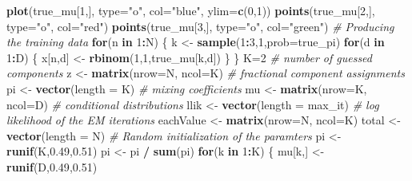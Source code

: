 \documentclass[]{article}
\newenvironment{Shaded}{\begin{snugshade}}{\end{snugshade}}
\newcommand{\KeywordTok}[1]{\textcolor[rgb]{0.13,0.29,0.53}{\textbf{#1}}}
\newcommand{\DataTypeTok}[1]{\textcolor[rgb]{0.13,0.29,0.53}{#1}}
\newcommand{\DecValTok}[1]{\textcolor[rgb]{0.00,0.00,0.81}{#1}}
\newcommand{\FloatTok}[1]{\textcolor[rgb]{0.00,0.00,0.81}{#1}}
\newcommand{\StringTok}[1]{\textcolor[rgb]{0.31,0.60,0.02}{#1}}
\newcommand{\CommentTok}[1]{\textcolor[rgb]{0.56,0.35,0.01}{\textit{#1}}}
\newcommand{\ControlFlowTok}[1]{\textcolor[rgb]{0.13,0.29,0.53}{\textbf{#1}}}
\newcommand{\OperatorTok}[1]{\textcolor[rgb]{0.81,0.36,0.00}{\textbf{#1}}}
\newcommand{\NormalTok}[1]{#1}
\begin{document}
\begin{Shaded}
\begin{Highlighting}[]
{\KeywordTok{plot}\NormalTok{(true_mu[}\DecValTok{1}\NormalTok{,], }\DataTypeTok{type=}\StringTok{"o"}\NormalTok{, }\DataTypeTok{col=}\StringTok{"blue"}\NormalTok{, }\DataTypeTok{ylim=}\KeywordTok{c}\NormalTok{(}\DecValTok{0}\NormalTok{,}\DecValTok{1}\NormalTok{))}
\KeywordTok{points}\NormalTok{(true_mu[}\DecValTok{2}\NormalTok{,], }\DataTypeTok{type=}\StringTok{"o"}\NormalTok{, }\DataTypeTok{col=}\StringTok{"red"}\NormalTok{)}
\KeywordTok{points}\NormalTok{(true_mu[}\DecValTok{3}\NormalTok{,], }\DataTypeTok{type=}\StringTok{"o"}\NormalTok{, }\DataTypeTok{col=}\StringTok{"green"}\NormalTok{)}
\CommentTok{# Producing the training data}
\ControlFlowTok{for}\NormalTok{(n }\ControlFlowTok{in} \DecValTok{1}\OperatorTok{:}\NormalTok{N) \{}
\NormalTok{k <-}\StringTok{ }\KeywordTok{sample}\NormalTok{(}\DecValTok{1}\OperatorTok{:}\DecValTok{3}\NormalTok{,}\DecValTok{1}\NormalTok{,}\DataTypeTok{prob=}\NormalTok{true_pi)}
\ControlFlowTok{for}\NormalTok{(d }\ControlFlowTok{in} \DecValTok{1}\OperatorTok{:}\NormalTok{D) \{}
\NormalTok{x[n,d] <-}\StringTok{ }\KeywordTok{rbinom}\NormalTok{(}\DecValTok{1}\NormalTok{,}\DecValTok{1}\NormalTok{,true_mu[k,d])}
\NormalTok{\}}
\NormalTok{\}}
\NormalTok{K=}\DecValTok{2} \CommentTok{# number of guessed components}
\NormalTok{z <-}\StringTok{ }\KeywordTok{matrix}\NormalTok{(}\DataTypeTok{nrow=}\NormalTok{N, }\DataTypeTok{ncol=}\NormalTok{K) }\CommentTok{# fractional component assignments}
\NormalTok{pi <-}\StringTok{ }\KeywordTok{vector}\NormalTok{(}\DataTypeTok{length =}\NormalTok{ K) }\CommentTok{# mixing coefficients}
\NormalTok{mu <-}\StringTok{ }\KeywordTok{matrix}\NormalTok{(}\DataTypeTok{nrow=}\NormalTok{K, }\DataTypeTok{ncol=}\NormalTok{D) }\CommentTok{# conditional distributions}
\NormalTok{llik <-}\StringTok{ }\KeywordTok{vector}\NormalTok{(}\DataTypeTok{length =}\NormalTok{ max_it) }\CommentTok{# log likelihood of the EM iterations}
\NormalTok{eachValue <-}\StringTok{ }\KeywordTok{matrix}\NormalTok{(}\DataTypeTok{nrow=}\NormalTok{N, }\DataTypeTok{ncol=}\NormalTok{K)}
\NormalTok{total <-}\StringTok{ }\KeywordTok{vector}\NormalTok{(}\DataTypeTok{length =}\NormalTok{ N)}
\CommentTok{# Random initialization of the paramters}
\NormalTok{pi <-}\StringTok{ }\KeywordTok{runif}\NormalTok{(K,}\FloatTok{0.49}\NormalTok{,}\FloatTok{0.51}\NormalTok{)}
\NormalTok{pi <-}\StringTok{ }\NormalTok{pi }\OperatorTok{/}\StringTok{ }\KeywordTok{sum}\NormalTok{(pi)}
\ControlFlowTok{for}\NormalTok{(k }\ControlFlowTok{in} \DecValTok{1}\OperatorTok{:}\NormalTok{K) \{}
\NormalTok{mu[k,] <-}\StringTok{ }\KeywordTok{runif}\NormalTok{(D,}\FloatTok{0.49}\NormalTok{,}\FloatTok{0.51}\NormalTok{)}
}
\end{Highlighting}
\end{Shaded}
\end{document}
